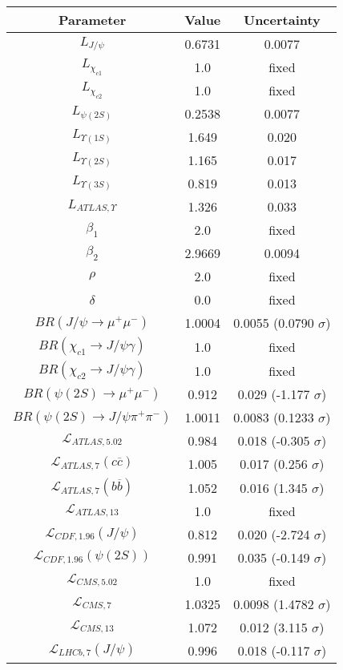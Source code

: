 \begin{table}[h!]
\centering
\begin{tabular}{c|c|c}
Parameter & Value & Uncertainty \\
\hline
$L_{J/\psi}$ & 0.6731 & 0.0077 \\
$L_{\chi_{c1}}$ & 1.0 & fixed \\
$L_{\chi_{c2}}$ & 1.0 & fixed \\
$L_{\psi(2S)}$ & 0.2538 & 0.0077 \\
$L_{\Upsilon(1S)}$ & 1.649 & 0.020 \\
$L_{\Upsilon(2S)}$ & 1.165 & 0.017 \\
$L_{\Upsilon(3S)}$ & 0.819 & 0.013 \\
$L_{ATLAS,\Upsilon}$ & 1.326 & 0.033 \\
$\beta_1$ & 2.0 & fixed \\
$\beta_2$ & 2.9669 & 0.0094 \\
$\rho$ & 2.0 & fixed \\
$\delta$ & 0.0 & fixed \\
$BR(J/\psi\rightarrow\mu^+\mu^-)$ & 1.0004 & 0.0055 (0.0790 $\sigma$) \\
$BR(\chi_{c1}\rightarrow J/\psi\gamma)$ & 1.0 & fixed \\
$BR(\chi_{c2}\rightarrow J/\psi\gamma)$ & 1.0 & fixed \\
$BR(\psi(2S)\rightarrow\mu^+\mu^-)$ & 0.912 & 0.029 (-1.177 $\sigma$) \\
$BR(\psi(2S)\rightarrow J/\psi\pi^+\pi^-)$ & 1.0011 & 0.0083 (0.1233 $\sigma$) \\
$\mathcal L_{ATLAS,5.02}$ & 0.984 & 0.018 (-0.305 $\sigma$) \\
$\mathcal L_{ATLAS,7}(c\overline c)$ & 1.005 & 0.017 (0.256 $\sigma$) \\
$\mathcal L_{ATLAS,7}(b\overline b)$ & 1.052 & 0.016 (1.345 $\sigma$) \\
$\mathcal L_{ATLAS,13}$ & 1.0 & fixed \\
$\mathcal L_{CDF,1.96}(J/\psi)$ & 0.812 & 0.020 (-2.724 $\sigma$) \\
$\mathcal L_{CDF,1.96}(\psi(2S))$ & 0.991 & 0.035 (-0.149 $\sigma$) \\
$\mathcal L_{CMS,5.02}$ & 1.0 & fixed \\
$\mathcal L_{CMS,7}$ & 1.0325 & 0.0098 (1.4782 $\sigma$) \\
$\mathcal L_{CMS,13}$ & 1.072 & 0.012 (3.115 $\sigma$) \\
$\mathcal L_{LHCb,7}(J/\psi)$ & 0.996 & 0.018 (-0.117 $\sigma$) \\

\end{tabular}
\end{table}
